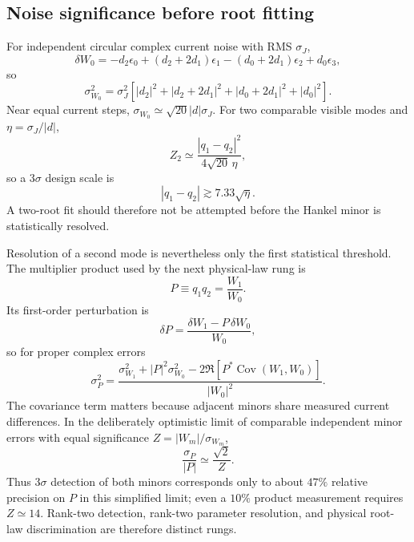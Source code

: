 \documentclass[11pt]{article}
\begin{document}
\subsection{Noise significance before root fitting}

For independent circular complex current noise with RMS $\sigma_J$,
\begin{equation}
\delta W_0
=-d_2\epsilon_0+(d_2+2d_1)\epsilon_1
-(d_0+2d_1)\epsilon_2+d_0\epsilon_3,
\end{equation}
so
\begin{equation}
\boxed{
\sigma_{W_0}^2=\sigma_J^2\left[
|d_2|^2+|d_2+2d_1|^2+|d_0+2d_1|^2+|d_0|^2
\right].}
\label{eq:Wnoise}
\end{equation}
Near equal current steps, $\sigma_{W_0}\simeq\sqrt{20}|d|\sigma_J$. For two comparable visible modes and $\eta=\sigma_J/|d|$,
\begin{equation}
Z_2\simeq\frac{|q_1-q_2|^2}{4\sqrt{20}\,\eta},
\end{equation}
so a $3\sigma$ design scale is
\begin{equation}
\boxed{|q_1-q_2|\gtrsim7.33\sqrt{\eta}.}
\label{eq:twores}
\end{equation}
A two-root fit should therefore not be attempted before the Hankel minor is statistically resolved.

Resolution of a second mode is nevertheless only the first statistical threshold.  The multiplier product used by the next physical-law rung is
\begin{equation}
P\equiv q_1q_2=\frac{W_1}{W_0}.
\label{eq:rank2_product_estimator}
\end{equation}
Its first-order perturbation is
\begin{equation}
\boxed{\delta P=\frac{\delta W_1-P\,\delta W_0}{W_0},}
\label{eq:rank2_product_delta}
\end{equation}
so for proper complex errors
\begin{equation}
\boxed{
\sigma_P^2=\frac{\sigma_{W_1}^2+|P|^2\sigma_{W_0}^2-2\Re\!\left[P^*\operatorname{Cov}(W_1,W_0)\right]}{|W_0|^2}.}
\label{eq:rank2_product_cov}
\end{equation}
The covariance term matters because adjacent minors share measured current differences.  In the deliberately optimistic limit of comparable independent minor errors with equal significance $Z=|W_m|/\sigma_{W_m}$,
\begin{equation}
\frac{\sigma_P}{|P|}\simeq\frac{\sqrt2}{Z}.
\end{equation}
Thus $3\sigma$ detection of both minors corresponds only to about $47\%$ relative precision on $P$ in this simplified limit; even a $10\%$ product measurement requires $Z\simeq14$.  Rank-two detection, rank-two parameter resolution, and physical root-law discrimination are therefore distinct rungs.
\end{document}
